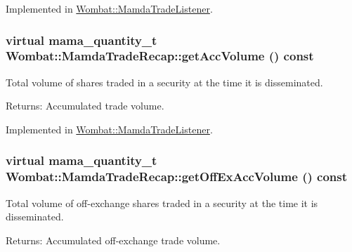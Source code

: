 Implemented in \hyperlink{classWombat_1_1MamdaTradeListener_09698082a48276bf7d67a160bdff61b7}{Wombat::Mamda\-Trade\-Listener}.\hypertarget{classWombat_1_1MamdaTradeRecap_1e7f8f77a649030465d7a4ccfa1baef0}{
\subsubsection[getAccVolume]{\setlength{\rightskip}{0pt plus 5cm}virtual mama\_\-quantity\_\-t Wombat::Mamda\-Trade\-Recap::get\-Acc\-Volume () const}}
\label{classWombat_1_1MamdaTradeRecap_1e7f8f77a649030465d7a4ccfa1baef0}


Total volume of shares traded in a security at the time it is disseminated. 

\begin{Desc}
\item[Returns:]Accumulated trade volume. \end{Desc}


Implemented in \hyperlink{classWombat_1_1MamdaTradeListener_7636476d5939f0128bf0a7fba1960cd6}{Wombat::Mamda\-Trade\-Listener}.\hypertarget{classWombat_1_1MamdaTradeRecap_5df4b8f6c1238676d1c50fb8d50ed2df}{
\subsubsection[getOffExAccVolume]{\setlength{\rightskip}{0pt plus 5cm}virtual mama\_\-quantity\_\-t Wombat::Mamda\-Trade\-Recap::get\-Off\-Ex\-Acc\-Volume () const}}
\label{classWombat_1_1MamdaTradeRecap_5df4b8f6c1238676d1c50fb8d50ed2df}


Total volume of off-exchange shares traded in a security at the time it is disseminated. 

\begin{Desc}
\item[Returns:]Accumulated off-exchange trade volume. \end{Desc}


